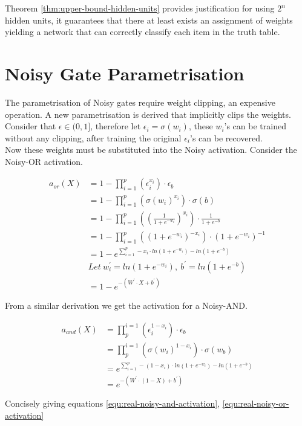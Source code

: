 Theorem \ref{thm:upper-bound-hidden-units} provides justification for using $2^n$ hidden units, it guarantees that there at least exists an assignment of weights yielding a network that can correctly classify each item in the truth table.

\section{Noisy Gate Parametrisation} \label{sec:real-noisy-parametrisation}
The parametrisation of Noisy gates require weight clipping, an expensive operation. A new parametrisation is derived that implicitly clips the weights. Consider that $\epsilon \in (0, 1]$, therefore let $\epsilon_i = \sigma(w_i)$, these $w_i$'s can be trained without any clipping, after training the original $\epsilon_i$'s can be recovered.\\

Now these weights must be substituted into the Noisy activation. Consider the Noisy-OR activation.

\begin{align*}
a_{or}(X) &= 1 - \prod^p_{i=1}(\epsilon_i^{x_i}) \cdot \epsilon_b\\
&= 1 - \prod^p_{i=1}(\sigma(w_i)^{x_i}) \cdot \sigma(b)\\
&= 1 - \prod^p_{i=1}((\frac{1}{1 + e^{-w_i}})^{x_i}) \cdot \frac{1}{1 + e^{-b}}\\
&= 1 - \prod^p_{i=1}((1 + e^{-w_i})^{-x_i}) \cdot (1 + e^{-w_i})^{-1}\\
&= 1 - e^{\sum^p_{i=1} -x_i \cdot ln(1 + e^{-w_i}) - ln(1 + e^{-b})} \\
&Let\ w_i^{'} = ln(1 + e^{-w_i}),\ b^{'} = ln(1 + e^{-b})\\
&= 1 - e^{-(W^{'} \cdot X + b^{'})}
\end{align*}

From a similar derivation we get the activation for a Noisy-AND.

\begin{align*}
a_{and}(X) &= \prod_{p}^{i=1} (\epsilon_i^{1 - x_i}) \cdot \epsilon_b\\
&= \prod_{p}^{i=1} (\sigma(w_i)^{1 - x_i}) \cdot \sigma(w_b)\\
&= e^{\sum^p_{i=1} -(1 - x_i) \cdot ln(1 + e^{-w_i}) - ln(1 + e^{-b})} \\
&= e^{-(W^{'} \cdot (1 - X) + b^{'})}
\end{align*}

Concisely giving equations \ref{equ:real-noisy-and-activation}, \ref{equ:real-noisy-or-activation}

